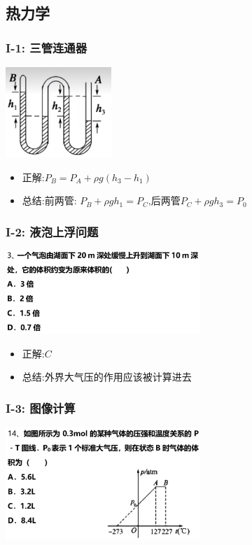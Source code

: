 \documentclass{article}
\begin{document}
\subsection{热力学}
\subsubsection{I-1: 三管连通器}
\includegraphics[width = 0.3\textwidth,keepaspectratio]{./pictures/2.3-1.png}
\begin{itemize}
    \item 正解:\quad $P_{B} = P_{A} + \rho g (h_{3} - h_{1}) $
    \item 总结:\quad 前两管: $ P_{B} + \rho g h_{1} = P_{C}\text{,后两管} P_{C} + \rho g h_{3} = P_{0}$

\end{itemize}

\vspace{2em}

\subsubsection{I-2: 液泡上浮问题}
\includegraphics[width = 0.55\textwidth,keepaspectratio]{./pictures/2.3-2.png}

\begin{itemize}
    \item 正解:\quad $C$
    \item 总结:\quad 外界大气压的作用应该被计算进去
\end{itemize}

\vspace{2em}

\subsubsection{I-3: 图像计算}
\includegraphics[width = 0.55\textwidth,keepaspectratio]{./pictures/2.3-3.png}
\end{document}
